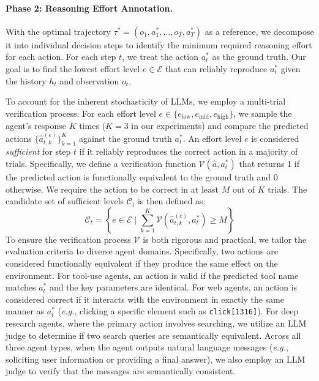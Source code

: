 \documentclass{article}
\theoremstyle{plain}
\theoremstyle{definition}
\theoremstyle{remark}
\begin{document}
\paragraph{Phase 2: Reasoning Effort Annotation.}

With the optimal trajectory $\tau^* = (o_1, a^*_1, \dots, o_T, a^*_T)$ as a reference, we decompose it into individual decision steps to identify the minimum required reasoning effort for each action. For each step $t$, we treat the action $a^*_t$ as the ground truth. Our goal is to find the lowest effort level $e \in \mathcal{E}$ that can reliably reproduce $a^*_t$ given the history $h_t$ and observation $o_t$.

To account for the inherent stochasticity of LLMs, we employ a multi-trial verification process. For each effort level $e \in \{e_{\mathrm{low}}, e_{\mathrm{mid}}, e_{\mathrm{high}}\}$, we sample the agent's response $K$ times ($K=3$ in our experiments) and compare the predicted actions $\{\hat{a}_{t,k}^{(e)}\}_{k=1}^K$ against the ground truth $a^*_t$.
An effort level $e$ is considered \textit{sufficient} for step $t$ if it reliably reproduces the correct action in a majority of trials. Specifically, we define a verification function $\mathcal{V}(\hat{a}, a^*_t)$ that returns 1 if the predicted action is functionally equivalent to the ground truth and 0 otherwise. We require the action to be correct in at least $M$ out of $K$ trials. The candidate set of sufficient levels $\mathcal{C}_t$ is then defined as:
\begin{equation}
\mathcal{C}_t = \left\{ e \in \mathcal{E} \mid \sum_{k=1}^{K} \mathcal{V}(\hat{a}_{t,k}^{(e)}, a^*_t) \ge M \right\}
\end{equation}
To ensure the verification process $\mathcal{V}$ is both rigorous and practical, we tailor the evaluation criteria to diverse agent domains. Specifically, two actions are considered functionally equivalent if they produce the same effect on the environment. 
For tool-use agents, an action is valid if the predicted tool name matches $a^*_t$ and the key parameters are identical. 
For web agents, an action is considered correct if it interacts with the environment in exactly the same manner as $a^*_t$ (\textit{e.g.}, clicking a specific element such as \texttt{click[1316]}). 
For deep research agents, where the primary action involves searching, we utilize an LLM judge to determine if two search queries are semantically equivalent. 
Across all three agent types, when the agent outputs natural language messages (\textit{e.g.}, soliciting user information or providing a final answer), we also employ an LLM judge to verify that the messages are semantically consistent.
\end{document}
